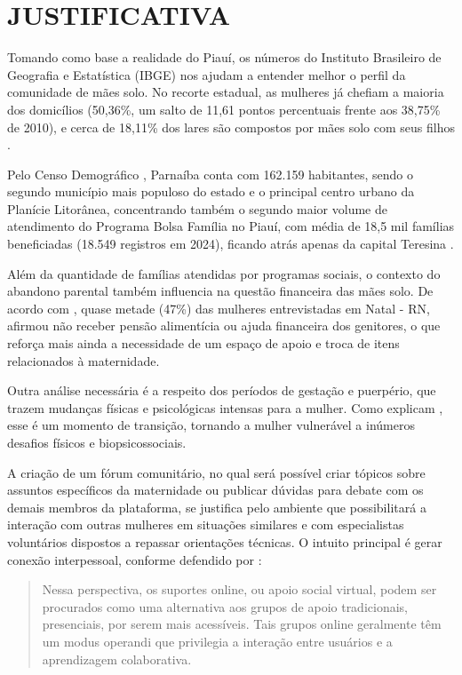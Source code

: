 \section{JUSTIFICATIVA}

Tomando como base a realidade do Piauí, os números do Instituto Brasileiro de Geografia e Estatística (IBGE) nos ajudam a entender melhor o perfil da comunidade de mães solo. No recorte estadual, as mulheres já chefiam a maioria dos domicílios (50,36\%, um salto de 11,61 pontos percentuais frente aos 38,75\% de 2010), e cerca de 18,11\% dos lares são compostos por mães solo com seus filhos \cite{ibge2023}.

Pelo Censo Demográfico \cite{ibge2023}, Parnaíba conta com 162.159 habitantes, sendo o segundo município mais populoso do estado e o principal centro urbano da Planície Litorânea, concentrando também o segundo maior volume de atendimento do Programa Bolsa Família no Piauí, com média de 18,5 mil famílias beneficiadas (18.549 registros em 2024), ficando atrás apenas da capital Teresina \cite{ibge2024}. 

Além da quantidade de famílias atendidas por programas sociais, o contexto do abandono parental também influencia na questão financeira das mães solo. De acordo com \cite{sousa2025}, quase metade (47\%) das mulheres entrevistadas em Natal - RN, afirmou não receber pensão alimentícia ou ajuda financeira dos genitores, o que reforça mais ainda a necessidade de um espaço de apoio e troca de itens relacionados à maternidade.

Outra análise necessária é a respeito dos períodos de gestação e puerpério, que trazem mudanças físicas e psicológicas intensas para a mulher. Como explicam \textcite[692]{brito2022}, esse é um momento de transição, tornando a mulher vulnerável a inúmeros desafios físicos e biopsicossociais.

A criação de um fórum comunitário, no qual será possível criar tópicos sobre assuntos específicos da maternidade ou publicar dúvidas para debate com os demais membros da plataforma, se justifica pelo ambiente que possibilitará a interação com outras mulheres em situações similares e com especialistas voluntários dispostos a repassar orientações técnicas. O intuito principal é gerar conexão interpessoal, conforme defendido por \textcite[692]{brito2022}:
\begin{quote}
Nessa perspectiva, os suportes online, ou apoio social virtual, podem ser procurados como uma alternativa aos grupos de apoio tradicionais, presenciais, por serem mais acessíveis. Tais grupos online geralmente têm um modus operandi que privilegia a interação entre usuários e a aprendizagem colaborativa.
\end{quote}

